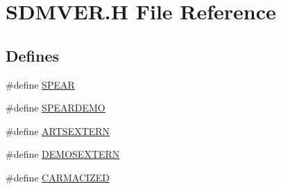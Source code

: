 \hypertarget{SDMVER_8H}{
\section{SDMVER.H File Reference}
\label{SDMVER_8H}
}
\subsection*{Defines}
\begin{DoxyCompactItemize}
\item 
\#define \hyperlink{SDMVER_8H_a440ca9e8cf364eaa6707e0cca9e022ca}{SPEAR}
\item 
\#define \hyperlink{SDMVER_8H_a42071ac8d89c85f4cbf18476fda95487}{SPEARDEMO}
\item 
\#define \hyperlink{SDMVER_8H_a36e8622d432bb1dcfc61ac233148b685}{ARTSEXTERN}
\item 
\#define \hyperlink{SDMVER_8H_aa38bbec192ab8931f108d382f7833c31}{DEMOSEXTERN}
\item 
\#define \hyperlink{SDMVER_8H_ab1d0a23b2e2640f4fbf73f30b3586f1b}{CARMACIZED}
\end{DoxyCompactItemize}


